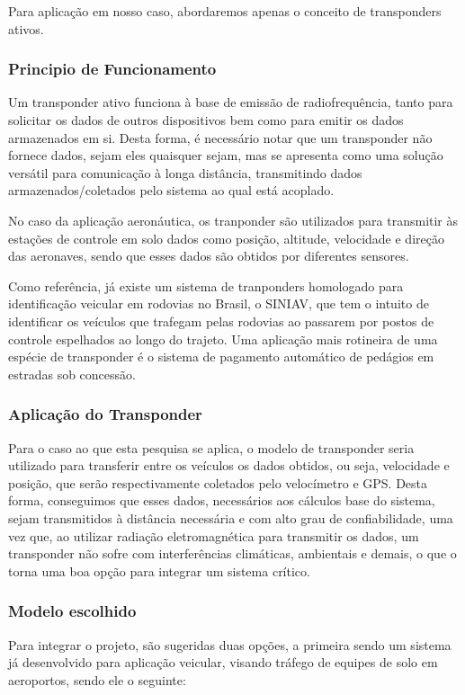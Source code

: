 Para aplicação em nosso caso, abordaremos apenas o conceito de transponders ativos.

\subsubsection{Principio de Funcionamento}
\label{subs:Principio de Funcionamento}

Um transponder ativo funciona à base de emissão de radiofrequência, tanto para solicitar os dados de outros dispositivos bem como para emitir os dados armazenados em si. Desta forma, é necessário notar que um transponder não fornece dados, sejam eles quaisquer sejam, mas se apresenta como uma solução versátil para comunicação à longa distância, transmitindo dados armazenados/coletados pelo sistema ao qual está acoplado.

  No caso da aplicação aeronáutica, os tranponder são utilizados para transmitir às estações de controle em solo dados como posição, altitude, velocidade e direção das aeronaves, sendo que esses dados são obtidos por diferentes sensores.

  Como referência, já existe um sistema de tranponders homologado para identificação veicular em rodovias no Brasil, o SINIAV, que tem o intuito de identificar os veículos que trafegam pelas rodovias ao passarem por postos de controle espelhados ao longo do trajeto. Uma aplicação mais rotineira de uma espécie de transponder é o sistema de pagamento automático de pedágios em estradas sob concessão.

\subsubsection{Aplicação do Transponder}
\label{subs:Aplicação do Transponder}
Para o caso ao que esta pesquisa se aplica, o modelo de transponder seria utilizado para transferir entre os veículos os dados obtidos, ou seja, velocidade e posição, que serão respectivamente coletados pelo velocímetro e GPS. Desta forma, conseguimos que esses dados, necessários aos cálculos base do sistema, sejam transmitidos à distância necessária e com alto grau de confiabilidade, uma vez que, ao utilizar radiação eletromagnética para transmitir os dados, um transponder não sofre com interferências climáticas, ambientais e demais, o que o torna uma boa opção para integrar um sistema crítico.

\subsubsection{Modelo escolhido}
\label{subs:Modelo escolhido}
Para integrar o projeto, são sugeridas duas opções, a primeira sendo um sistema já desenvolvido para aplicação veicular, visando tráfego de equipes de solo em aeroportos, sendo ele o seguinte:


